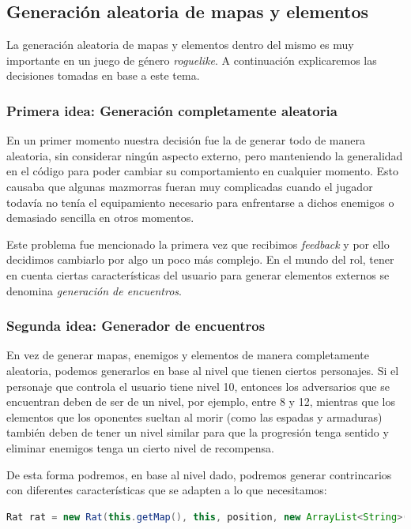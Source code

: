 \subsection{Generación aleatoria de mapas y elementos}

La generación aleatoria de mapas y elementos dentro del mismo es muy importante en un juego de género \textit{roguelike}. A continuación explicaremos las decisiones tomadas en base a este tema.

\subsubsection{Primera idea: Generación completamente aleatoria}

En un primer momento nuestra decisión fue la de generar todo de manera aleatoria, sin considerar ningún aspecto externo, pero manteniendo la generalidad en el código para poder cambiar su comportamiento en cualquier momento. Esto causaba que algunas mazmorras fueran muy complicadas cuando el jugador todavía no tenía el equipamiento necesario para enfrentarse a dichos enemigos o demasiado sencilla en otros momentos.

Este problema fue mencionado la primera vez que recibimos \textit{feedback} y por ello decidimos cambiarlo por algo un poco más complejo. En el mundo del rol, tener en cuenta ciertas características del usuario para generar elementos externos se denomina \textit{generación de encuentros}.

\subsubsection{Segunda idea: Generador de encuentros}
\label{generadorencuentros}

En vez de generar mapas, enemigos y elementos de manera completamente aleatoria, podemos generarlos en base al nivel que tienen ciertos personajes. Si el personaje que controla el usuario tiene nivel 10, entonces los adversarios que se encuentran deben de ser de un nivel, por ejemplo, entre 8 y 12, mientras que los elementos que los oponentes sueltan al morir (como las espadas y armaduras) también deben de tener un nivel similar para que la progresión tenga sentido y eliminar enemigos tenga un cierto nivel de recompensa.

De esta forma podremos, en base al nivel dado, podremos generar contrincarios con diferentes características que se adapten a lo que necesitamos:

\begin{lstlisting}[language=java]
Rat rat = new Rat(this.getMap(), this, position, new ArrayList<String>(), level);
\end{lstlisting}

